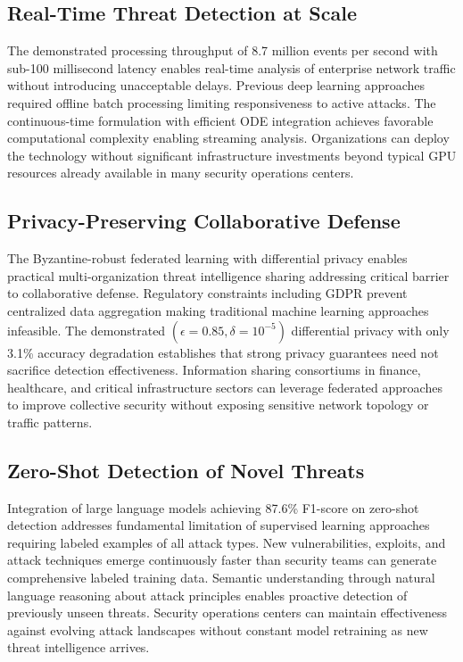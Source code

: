 \subsection*{Real-Time Threat Detection at Scale}

The demonstrated processing throughput of 8.7 million events per second with sub-100 millisecond latency enables real-time analysis of enterprise network traffic without introducing unacceptable delays. Previous deep learning approaches required offline batch processing limiting responsiveness to active attacks. The continuous-time formulation with efficient ODE integration achieves favorable computational complexity enabling streaming analysis. Organizations can deploy the technology without significant infrastructure investments beyond typical GPU resources already available in many security operations centers.

\subsection*{Privacy-Preserving Collaborative Defense}

The Byzantine-robust federated learning with differential privacy enables practical multi-organization threat intelligence sharing addressing critical barrier to collaborative defense. Regulatory constraints including GDPR prevent centralized data aggregation making traditional machine learning approaches infeasible. The demonstrated $(\epsilon = 0.85, \delta = 10^{-5})$ differential privacy with only 3.1\% accuracy degradation establishes that strong privacy guarantees need not sacrifice detection effectiveness. Information sharing consortiums in finance, healthcare, and critical infrastructure sectors can leverage federated approaches to improve collective security without exposing sensitive network topology or traffic patterns.

\subsection*{Zero-Shot Detection of Novel Threats}

Integration of large language models achieving 87.6\% F1-score on zero-shot detection addresses fundamental limitation of supervised learning approaches requiring labeled examples of all attack types. New vulnerabilities, exploits, and attack techniques emerge continuously faster than security teams can generate comprehensive labeled training data. Semantic understanding through natural language reasoning about attack principles enables proactive detection of previously unseen threats. Security operations centers can maintain effectiveness against evolving attack landscapes without constant model retraining as new threat intelligence arrives.

